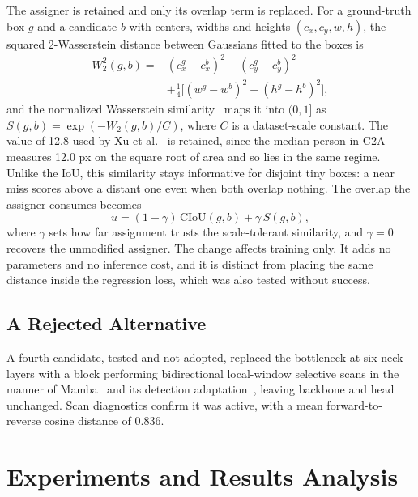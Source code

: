 \documentclass[conference,a4paper]{IEEEtran}
\begin{document}
The assigner is retained and only its overlap term is replaced. For a ground-truth box
$g$ and a candidate $b$ with centers, widths and heights $(c_x, c_y, w, h)$, the
squared 2-Wasserstein distance between Gaussians fitted to the boxes is
\begin{equation}
\begin{split}
  W_2^2(g,b) = {}&(c_{x}^{g} - c_{x}^{b})^2 + (c_{y}^{g} - c_{y}^{b})^2 \\
                &+ \tfrac{1}{4}\big[(w^{g} - w^{b})^2 + (h^{g} - h^{b})^2\big],
\end{split}
\end{equation}
and the normalized Wasserstein similarity~\cite{xu2022nwdrka} maps it into
$(0,1]$ as $S(g,b) = \exp(-W_2(g,b)/C)$, where $C$ is a dataset-scale constant.
The value of 12.8 used by Xu et al.~\cite{xu2022nwdrka} is retained, since the
median person in C2A measures 12.0 px on the square root of area and so lies in
the same regime. Unlike the IoU, this similarity stays
informative for disjoint tiny boxes: a near miss scores above a distant one even
when both overlap nothing. The overlap the assigner consumes becomes
\begin{equation}
  u = (1-\gamma)\,\mathrm{CIoU}(g,b) + \gamma\, S(g,b),
  \label{eq:blend}
\end{equation}
where $\gamma$ sets how far assignment trusts the scale-tolerant similarity, and
$\gamma = 0$ recovers the unmodified assigner. The change affects training only.
It adds no parameters and no inference cost, and it is distinct from placing the
same distance inside the regression loss, which was also tested without success.

\subsection{A Rejected Alternative}
A fourth candidate, tested and not adopted, replaced the bottleneck at six neck
layers with a block performing bidirectional local-window selective scans in the
manner of Mamba~\cite{gu2023mamba} and its detection
adaptation~\cite{wang2025mambayolo}, leaving backbone and head unchanged. Scan diagnostics confirm it was active,
with a mean forward-to-reverse cosine distance of 0.836.

\section{Experiments and Results Analysis}
\end{document}
